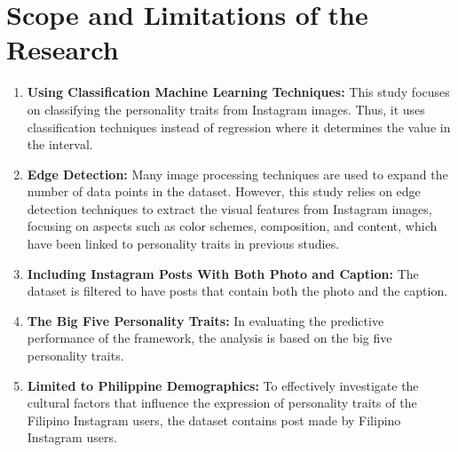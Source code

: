 %
%




\section{Scope and Limitations of the Research}
\label{sec:scopelimitations}

\begin{enumerate}[label=\textbf{ \arabic*:}, leftmargin=*]
	\item \textbf{Using Classification Machine Learning Techniques:} This study focuses on classifying the personality traits from Instagram images. Thus, it uses classification techniques instead of regression where it determines the value in the interval.
	 
	\item \textbf{Edge Detection:} Many image processing techniques are used to expand the number of data points in the dataset. However, this study relies on edge detection techniques to extract the visual features from Instagram images, focusing on aspects such as color schemes, composition, and content, which have been linked to personality traits in previous studies.
	
	\item \textbf{Including Instagram Posts With Both Photo and Caption:} The dataset is filtered to have posts that contain both the photo and the caption.
	
	\item \textbf{The Big Five Personality Traits:} In evaluating the predictive performance of the framework, the analysis is based on the big five personality traits.
	
	\item \textbf{Limited to Philippine Demographics:} To effectively investigate the cultural factors that influence the expression of personality traits of the Filipino Instagram users, the dataset contains post made by Filipino Instagram users.
\end{enumerate}

